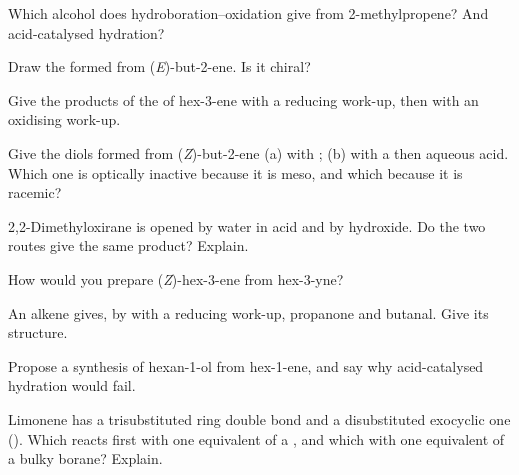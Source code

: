 \begin{exercise}[$\star$]\label{exo:b2:alkene-redox:2}
Which alcohol does hydroboration--oxidation give from 2-methylpropene? And acid-catalysed
hydration?
\end{exercise}

\begin{exercise}[$\star$]\label{exo:b2:alkene-redox:3}
Draw the  formed from (\textit{E})-but-2-ene. Is it chiral?
\end{exercise}

\begin{exercise}[$\star$]\label{exo:b2:alkene-redox:4}
Give the products of the  of hex-3-ene with a reducing work-up, then with an
oxidising work-up.
\end{exercise}

\begin{exercise}[$\star\star$]\label{exo:b2:alkene-redox:5}
Give the diols formed from (\textit{Z})-but-2-ene (a) with ; (b) with a  then aqueous acid. Which one is optically inactive because it is meso, and which
because it is racemic?
\end{exercise}

\begin{exercise}[$\star\star$]\label{exo:b2:alkene-redox:6}
2,2-Dimethyloxirane is opened by water in acid and by hydroxide. Do the two routes give the
same product? Explain.
\end{exercise}

\begin{exercise}[$\star\star$]\label{exo:b2:alkene-redox:7}
How would you prepare (\textit{Z})-hex-3-ene from hex-3-yne?
\end{exercise}

\begin{exercise}[$\star\star$]\label{exo:b2:alkene-redox:8}
An alkene  gives, by  with a reducing work-up, propanone and butanal.
Give its structure.
\end{exercise}

\begin{exercise}[$\star\star$]\label{exo:b2:alkene-redox:9}
Propose a synthesis of hexan-1-ol from hex-1-ene, and say why acid-catalysed hydration
would fail.
\end{exercise}

\begin{exercise}[$\star\star\star$]\label{exo:b2:alkene-redox:10}
Limonene has a trisubstituted ring double bond and a disubstituted exocyclic one
(). Which reacts first with one equivalent of a , and which with
one equivalent of a bulky borane? Explain.
\end{exercise}

